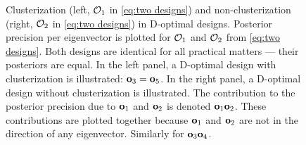 \begin{figure}
  \caption{Clusterization (left, $\mathcal{O}_1$ in \eqref{eq:two designs})
    and non-clusterization (right, $\mathcal{O}_2$ in \eqref{eq:two designs})
    in D-optimal designs. Posterior precision per eigenvector is
    plotted for $\mathcal{O}_1$ and $\mathcal{O}_2$ from \eqref{eq:two
      designs}. Both designs are identical for all practical matters
    --- their posteriors are equal. In the left panel, a D-optimal
    design with clusterization is illustrated: $\mathbf{o}_3 = \mathbf{o}_5$. In
    the right panel, a D-optimal design without clusterization is
    illustrated. The contribution to the posterior precision due to
    $\mathbf{o}_1$ and $\mathbf{o}_2$ is denoted $\mathbf{o}_1\mathbf{o}_2$. These
    contributions are plotted together because $\mathbf{o}_1$ and $\mathbf{o}_2$
    are not in the direction of any eigenvector. Similarly for
    $\mathbf{o}_3\mathbf{o}_4$.}
  \label{fig:clusterization}
\end{figure}
